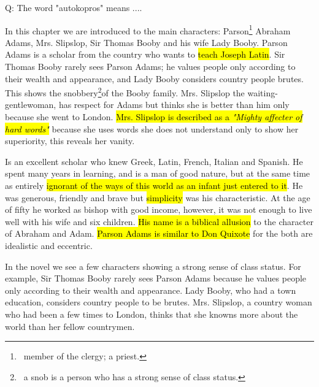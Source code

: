 \documentclass[12pt, a4paper]{article}
\begin{document}

{Q: The word "autokopros" means ....}

\enlargethispage{\baselineskip}

\ind In this chapter we are introduced to the main characters: Parson\footnote{\, 
member of the clergy; a priest.}  Abraham Adams,
Mrs. Slipslop, Sir Thomas Booby and his wife Lady Booby. Parson Adams is a scholar from 
the country who wants to \hl{teach Joseph Latin}.
Sir Thomas Booby rarely sees Parson Adams; he values people only according to their
wealth and appearance, and Lady Booby considers country people brutes. This shows the snobbery\footnote{
\, a snob is a person who has a strong sense of class status.}of
the Booby family. Mrs. Slipslop the waiting-gentlewoman, has respect for Adams  but thinks she
is better than him only because she went to London. \hl{Mrs. Slipslop is described as a
\textit{"Mighty affecter of hard words"}}
because she uses words she does not understand only to show her superiority,
this reveals her vanity.



\ind Is an excellent scholar who knew Greek, Latin, French, Italian and Spanish.
He spent many years in learning, and is a man of good nature, but at the 
same time as entirely \hl{ignorant of the ways of this world as an infant just
entered to it}. He was generous, friendly and brave but \hl{simplicity} was 
his characteristic. At the age of fifty he worked as bishop with good income,
however, it was not enough to live well with his wife and six children. \hl{His name
is a biblical allusion} to the character of Abraham and Adam. \hl{Parson Adams is similar to 
Don Quixote} for the both are idealistic and eccentric.


\ind In the novel we see a few characters showing a strong sense of class status. For example,
Sir Thomas Booby rarely sees Parson Adams because he values people only according to their
wealth and appearance. Lady Booby, who had a town education, considers country people to be brutes.
Mrs. Slipslop, a country woman who had been a few times to London, thinks that she knowns more about the world 
than her fellow countrymen.
\end{document}
